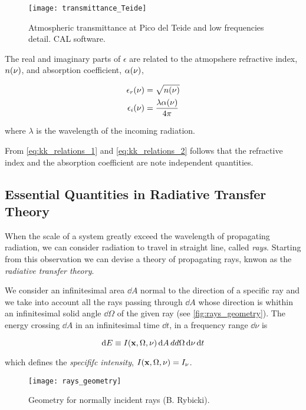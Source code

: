\begin{figure}
        \centering
        \texttt{[image: transmittance\_Teide]}
        \caption{Atmospheric transmittance at Pico del Teide and low
        frequencies detail. CAL software.}
        \label{fig:transmittance_teide}
\end{figure}


The real and imaginary parts of $\epsilon$ are related to the atmopshere
refractive index, $n\qty(\nu)$, and absorption coefficient, $\alpha\qty(\nu)$,

\begin{align}
        \epsilon_r\qty(\nu) & = \sqrt{n\qty(\nu)} \\
        \epsilon_i\qty(\nu) & = \frac{\lambda \alpha\qty(\nu)}{4\pi}
\end{align}

where $\lambda$ is the wavelength of the incoming radiation.

From \autoref{eq:kk_relations_1} and \autoref{eq:kk_relations_2} follows that
the refractive index and the absorption coefficient are note independent
quantities.

\subsection{Essential Quantities in Radiative Transfer Theory}

When the scale of a system greatly exceed the wavelength of propagating
radiation, we can consider radiation to travel in straight line, called
\emph{rays}. Starting from this observation we can devise a theory of
propagating rays, knwon as the \emph{radiative transfer theory}.

We consider an infinitesimal area $\dd{A}$ normal to the direction of a
specific ray and we take into account all the rays passing through $\dd{A}$
whose direction is whithin an infinitesimal solid angle $\dd{\Omega}$ of
the given ray (see \autoref{fig:rays_geometry}). The energy crossing
$\dd{A}$ in an infinitesimal time $\dd{t}$, in a frequency range $\dd{\nu}$
is

\begin{equation}
        \dd{E} \equiv
        I\qty(\vb{x},\Omega,\nu)\dd{A}dd{\Omega}\dd{\nu}\dd{t}
\end{equation}

which defines the \emph{specififc intensity}, $I\qty(\vb{x},\Omega,\nu) =
I_\nu$.

\begin{figure}
        \centering
        \texttt{[image: rays\_geometry]}
        \caption{Geometry for normally incident rays (B. Rybicki).}
        \label{fig:rays_geometry}
\end{figure}

